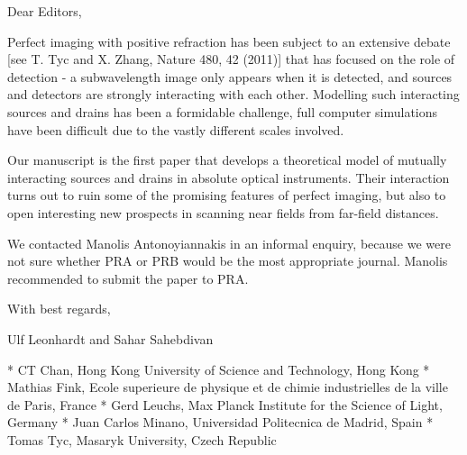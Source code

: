 Dear Editors,

Perfect imaging with positive refraction has been subject to an extensive debate [see T. Tyc and X. Zhang, Nature 480, 42 (2011)] that has focused on the role of detection - a subwavelength image only appears when it is detected, and sources and detectors are strongly interacting with each other. Modelling such interacting sources and drains has been a formidable challenge, full computer simulations have been difficult due to the vastly different scales involved. 

Our manuscript is the first paper that develops a theoretical model of mutually interacting sources and drains in absolute optical instruments. Their interaction turns out to ruin some of the promising features of perfect imaging, but also to open interesting new prospects in scanning near fields from far-field distances.

We contacted Manolis Antonoyiannakis in an informal enquiry, because we were not sure whether PRA or PRB would be the most appropriate journal. Manolis recommended to submit the paper to PRA. 

With best regards,

Ulf Leonhardt and Sahar Sahebdivan

* CT Chan, Hong Kong University of Science and Technology, Hong Kong
* Mathias Fink, Ecole superieure de physique et de chimie industrielles de la ville de Paris, France
* Gerd Leuchs, Max Planck Institute for the Science of Light, Germany
* Juan Carlos Minano, Universidad Politecnica de Madrid, Spain
* Tomas Tyc, Masaryk University, Czech Republic